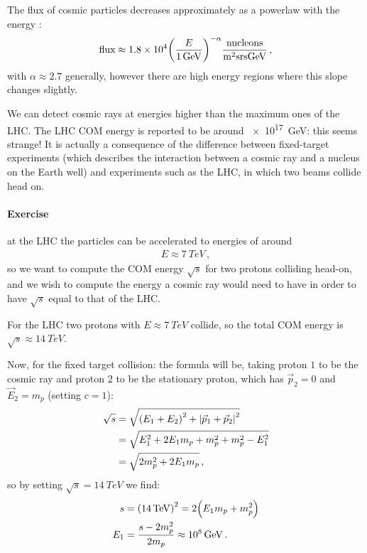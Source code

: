 \documentclass[main.tex]{subfiles}
\begin{document}
The flux of cosmic particles decreases approximately as a powerlaw with the energy \cite[eq. 30.2]{patrignaniCosmicRays}: 
%
\begin{align}
\text{flux} \approx \num{1.8e4} \qty(\frac{E}{\SI{1}{GeV}})^{-\alpha }  \frac{\text{nucleons}}{\SI{}{m^2 sr s GeV}}
\,,
\end{align}
%
with \(\alpha \approx \num{2.7}\) generally, however there are high energy regions where this slope changes slightly.

We can detect cosmic rays at energies higher than the maximum ones of the LHC. 
The LHC COM energy is reported to be around \SI{e17}{GeV}: this seems strange!
It is actually a consequence of the difference between fixed-target experiments (which describes the interaction between a cosmic ray and a nucleus on the Earth well) and experiments such as the LHC, in which two beams collide head on.

\paragraph{Exercise} at the LHC the particles can be accelerated to energies of around
%
\begin{align}
E \approx \SI{7}{TeV}
\,,
\end{align}
%
so we want to compute the COM energy \(\sqrt{s}\) for two protons colliding head-on, and we wish to compute the energy a cosmic ray would need to have in order to have \(\sqrt{s}\) equal to that of the LHC. 

For the LHC two protons with \(E \approx \SI{7}{TeV}\) collide, so the total COM energy is \(\sqrt{s} \approx \SI{14}{TeV}\). 

Now, for the fixed target collision: the formula will be, taking proton \(1 \) to be the cosmic ray and proton \(2\) to be the stationary proton, which has \(\vec{p}_{2} = 0\) and \(\vec{E}_{2}  = m_p\) (setting \(c=1\)):  
%
\begin{align}
\sqrt{s} &= \sqrt{\qty(E_1 + E_2 )^2 + \abs{\vec{p}_1 + \vec{p}_2}^2 }  \\
&= \sqrt{E_1^2 + 2 E_1 m_p + m_p^2 + m_p^2 - E_1^2}  \\
&= \sqrt{2 m_p^2 + 2 E_1 m_p} 
\,,
\end{align}
%
so by setting \(\sqrt{s} = \SI{14}{TeV}\) we find: 
%
\begin{align}
s &=  \qty(\SI{14}{TeV})^2= 2 \qty(E_1 m_p + m_p^2)  \\
E_1 &= \frac{s - 2 m_p^2}{2 m_p} \approx \SI{e8}{GeV}
\,.
\end{align}
\end{document}
